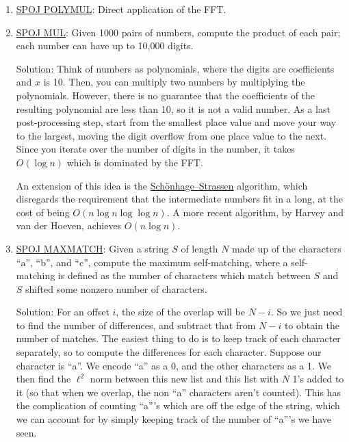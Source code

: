 \documentclass[11pt, oneside]{article}
\theoremstyle{plain}
\theoremstyle{definition}
\begin{document}
\begin{enumerate}
  \item \href{https://www.spoj.com/problems/POLYMUL/}{SPOJ POLYMUL}:
    Direct application of the FFT.

  \item \href{https://www.spoj.com/problems/MUL/}{SPOJ MUL}:
    Given 1000 pairs of numbers, compute the product of each pair;
    each number can have up to 10,000 digits.

    Solution: Think of numbers as polynomials, where the digits are coefficients
    and \( x \) is 10. Then, you can multiply two numbers by multiplying the
    polynomials. However, there is no guarantee that the coefficients
    of the resulting polynomial are less than 10, so it is not a valid number.
    As a last post-processing step, start from the smallest place value
    and move your way to the largest, moving the digit overflow from one place
    value to the next. Since you iterate over the number of digits in the
    number, it takes \( O(\log n) \) which is dominated by the FFT.
    
    An extension of this idea is the 
    \href{https://en.wikipedia.org/wiki/Sch%C3%B6nhage%E2%80%93Strassen_algorithm}
    {Schönhage–Strassen} algorithm, which disregards the requirement
    that the intermediate numbers fit in a long, at the cost of being
    \( O(n \log n \log \log n) \). A more recent algorithm,
    by Harvey and van der Hoeven, achieves 
    \href{https://hal.archives-ouvertes.fr/hal-02070778/document}{\( O(n \log n) \)}.

  \item \href{https://www.spoj.com/problems/MAXMATCH/}{SPOJ MAXMATCH}:
    Given a string \( S \) of length \( N \) made up of the characters
    \enquote{a}, \enquote{b}, and \enquote{c}, compute the maximum
    self-matching, where a self-matching is defined as the number of characters
    which match between \( S \) and \( S \) shifted some
    nonzero number of characters.

    Solution: For an offset \( i \), the size of the overlap
    will be \( N - i \). So we just need to find the number of differences,
    and subtract that from \( N - i \) to obtain the number of matches.
    The easiest thing to do is to keep track of each character separately,
    so to compute the differences for each character.
    Suppose our character is \enquote{a}. We encode \enquote{a} as a 0,
    and the other characters as a 1. We then find the \( \ell^2 \) norm between 
    this new list and this list with \( N \) 1's added to it
    (so that when we overlap, the non \enquote{a} characters aren't counted).
    This has the complication of counting \enquote{a}'s which are off the edge
    of the string, which we can account for by simply keeping track of the 
    number of \enquote{a}'s we have seen.


\end{enumerate}
\end{document}
